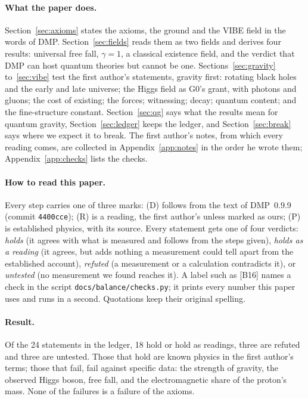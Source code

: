 \documentclass[11pt,a4paper]{article}
\theoremstyle{definition}
\newcommand{\chk}[1]{\textsf{[#1]}}
\newcommand{\tagD}{\textsf{(D)}}
\newcommand{\tagR}{\textsf{(R)}}
\newcommand{\tagP}{\textsf{(P)}}
\begin{document}
\paragraph{What the paper does.} Section~\ref{sec:axioms} states the axioms, the ground and the VIBE field in the words of DMP.
Section~\ref{sec:fields} reads them as two fields and derives four results: universal free fall, $\gamma=1$, a classical existence field, and
the verdict that DMP can host quantum theories but cannot be one. Sections~\ref{sec:gravity} to~\ref{sec:vibe} test the first author's statements,
gravity first: rotating black holes and the early and late universe; the Higgs field as G0's grant, with photons and gluons; the cost of
existing; the forces; witnessing; decay; quantum content; and the fine-structure constant. Section~\ref{sec:qg} says what the results mean
for quantum gravity, Section~\ref{sec:ledger} keeps the ledger, and Section~\ref{sec:break} says where we expect it to break. The first
author's notes, from which every reading comes, are collected in Appendix~\ref{app:notes} in the order he wrote them; Appendix~\ref{app:checks}
lists the checks.

\paragraph{How to read this paper.} Every step carries one of three marks: \tagD{} follows from the text of DMP~0.9.9 (commit
\texttt{4400cce}); \tagR{} is a reading, the first author's unless marked as ours; \tagP{} is established physics, with its source. Every
statement gets one of four verdicts: \emph{holds} (it agrees with what is measured and follows from the steps given), \emph{holds as a
reading} (it agrees, but adds nothing a measurement could tell apart from the established account), \emph{refuted} (a measurement or a
calculation contradicts it), or \emph{untested} (no measurement we found reaches it). A label such as \chk{B16} names a check in the script
\texttt{docs/balance/checks.py}; it prints every number this paper uses and runs in a second. Quotations keep their original spelling.

\paragraph{Result.} Of the 24 statements in the ledger, 18 hold or hold as readings, three are refuted and three are untested. Those that
hold are known physics in the first author's terms; those that fail, fail against specific data: the strength of gravity, the observed
Higgs boson, free fall, and the electromagnetic share of the proton's mass. None of the failures is a failure of the axioms.
\end{document}
